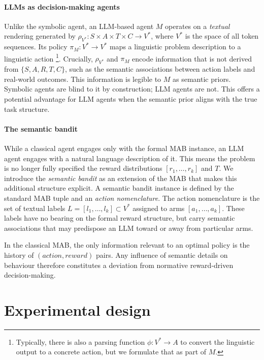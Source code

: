 \documentclass{article} %
\begin{document}
\paragraph{LLMs as decision-making agents}
Unlike the symbolic agent, an LLM-based agent $M$ operates on a \textit{textual} rendering generated by $\rho_{V^*} : S \times A \times T \times C \rightarrow V^*$, where $V^*$ is the space of all token sequences. Its policy $\pi_M : V^* \rightarrow V^*$ maps a linguistic problem description to a linguistic action \footnote{Typically, there is also a parsing function $\phi : V^* \rightarrow A$ to convert the linguistic output to a concrete action, but we formulate that as part of $M$.}. Crucially, $\rho_{V^*}$ and $\pi_M$ encode information that is not derived from $\{S, A, R,T,C\}$, such as the semantic associations between action labels and real-world outcomes. This information is legible to $M$ as semantic priors. Symbolic agents are blind to it by construction; LLM agents are not. This offers a potential advantage for LLM agents when the semantic prior aligns with the true task structure.

\paragraph{The semantic bandit}
\label{sec:sem_bandit_def}

While a classical agent engages only with the formal MAB instance, an LLM agent engages with a natural language description of it. This means the problem is no longer fully specified the reward distributions $[r_1, \ldots, r_k]$ and $T$. We introduce the \textit{semantic bandit} as an extension of the MAB that makes this additional structure explicit. A semantic bandit instance is defined by the standard MAB tuple and an \textit{action nomenclature}. The action nomenclature is the set of textual labels $L = [l_1, \ldots, l_k] \subset V^*$ assigned to arms $[a_1, \ldots, a_k]$. These labels have no bearing on the formal reward structure, but carry semantic associations that may predispose an LLM toward or away from particular arms.

In the classical MAB, the only information relevant to an optimal policy is the history of $(action, reward)$ pairs. Any influence of semantic details on behaviour therefore constitutes a deviation from normative reward-driven decision-making.

\section{Experimental design}
\end{document}
